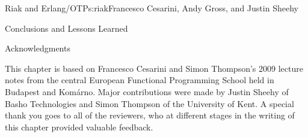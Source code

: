 \begin{aosachapter}{Riak and Erlang/OTP}{s:riak}{Francesco Cesarini, Andy Gross, and Justin Sheehy}
\begin{aosasect1}{Conclusions and Lessons Learned}
\begin{aosasect2}{Acknowledgments}

This chapter is based on Francesco Cesarini and Simon Thompson's 2009
lecture notes from the central European Functional Programming School
held in Budapest and Kom\'{a}rno. Major contributions were made by Justin
Sheehy of Basho Technologies and Simon Thompson of the University of
Kent. A special thank you goes to all of the reviewers, who at
different stages in the writing of this chapter provided valuable
feedback.

\end{aosasect2}

\end{aosasect1}

\end{aosachapter}
